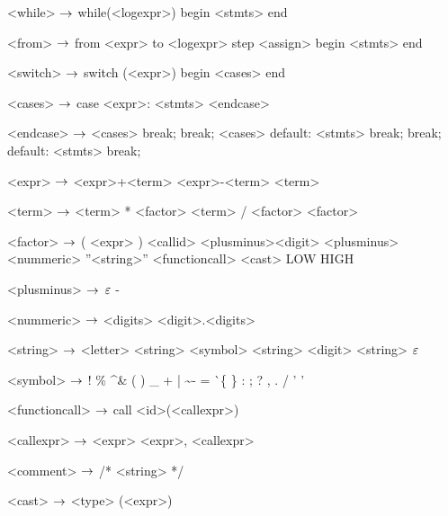 \begin{grammar}
<while> $\rightarrow$ while(<logexpr>)
		begin
			<stmts>
		end
		
<from> $\rightarrow$ from <expr> to <logexpr> step <assign>
	begin
		<stmts>
	end

<switch> $\rightarrow$ switch (<expr>)
		begin
			<cases>
		end

<cases> $\rightarrow$ case <expr>:
			<stmts>
		<endcase>
		
<endcase> $\rightarrow$ <cases>
		\alt break;
		\alt break;
		<cases>
		\alt default:
			<stmts>
			break;
		\alt break;
		default:
			<stmts>
			break;

<expr> $\rightarrow$ <expr>+<term>
	\alt<expr>-<term>
	\alt<term>

<term> $\rightarrow$ <term> * <factor>
	\alt <term> / <factor>
	\alt <factor>

<factor> $\rightarrow$ ( <expr> )
	\alt <callid>
	\alt <plusminus><digit>
	\alt <plusminus><nummeric>
	\alt ''<string>''
	\alt <functioncall> 
	\alt <cast>
	\alt LOW
	\alt HIGH

<plusminus> $\rightarrow$ $\varepsilon$
	\alt -

<nummeric> $\rightarrow$ <digits>
	\alt <digit>.<digits>

<string> $\rightarrow$ <letter> <string>
\alt <symbol> <string>
\alt <digit> <string>
\alt $\varepsilon$

<symbol> $\rightarrow$ !
\alt \%
\alt \^
\alt \&
\alt *
\alt (
\alt )
\alt \_
\alt +
\alt |
\alt \~
\alt -
\alt =
\alt \`
\alt \{
\alt \}
\alt [
\alt ]
\alt :
\alt ;
\alt ?
\alt ,
\alt .
\alt /
\alt ' '

<functioncall> $\rightarrow$ call <id>(<callexpr>)

<callexpr> $\rightarrow$ <expr>
\alt <expr>, <callexpr>

<comment> $\rightarrow$ /* <string> */

<cast> $\rightarrow$ <type> (<expr>)

\end{grammar}